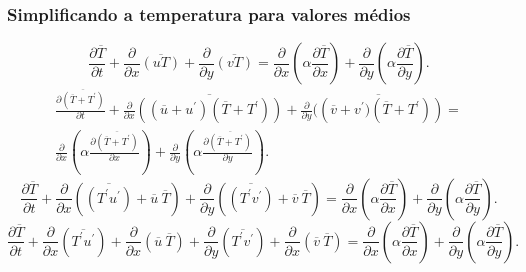 \documentclass[xcolor=dvipsnames,10pt,aspectratio=169]{beamer}
\begin{document}
		
		\begin{frame}
		\frametitle{Simplificando a temperatura para valores médios}
		\begin{equation}
		\frac{\partial \overline{T}}{\partial t} + {\frac{\partial{}}{\partial{x}} \overline{(u T)}} + 
		{\frac{\partial{}}{\partial{y}} \overline{(v T)}} 
		=
		{\frac{\partial{}}{\partial{x}}} \left(\alpha {\frac{\partial{\overline{T}}}{\partial{x}}} \right) +
		{\frac{\partial{}}{\partial{y}}} \left(\alpha {\frac{\partial{\overline{T}}}{\partial{y}}} \right) .
		\end{equation}
		\begin{equation}
		\begin{split}
		\frac{\partial \overline{(\overline{T} + T^\prime)}}{\partial t} +{\frac{\partial{}}{\partial{x}} \overline{\left((\overline{u} + u^\prime)  (\overline{T} + T^\prime) \right)}} + 
		{\frac{\partial{}}{\partial{y}} \overline{(\left(\overline{v} + v^\prime)  (\overline{T} + T^\prime) \right)}} 
		= \\
		{\frac{\partial{}}{\partial{x}}} \left(\alpha {\frac{\partial{\overline{(\overline{T} + T^\prime)}}}{\partial{x}}} \right) +
		{\frac{\partial{}}{\partial{y}}} \left(\alpha {\frac{\partial{\overline{(\overline{T} + T^\prime)}}}{\partial{y}}} \right) .
		\end{split}
		\end{equation}
		\begin{equation}
		\frac{\partial \overline{T}}{\partial t} +\frac{\partial{}}{\partial{x}} \left(\overline{\left({T^\prime u^\prime}\right)} + \overline{u} \ \overline{T}\right)     + 
		\frac{\partial{}}{\partial{y}} \left(\overline{\left({T^\prime v^\prime}\right)} + \overline{v} \ \overline{T}\right) 
		=
		{\frac{\partial{}}{\partial{x}}} \left(\alpha {\frac{\partial{\overline{T}}}{\partial{x}}} \right) +
		{\frac{\partial{}}{\partial{y}}} \left(\alpha {\frac{\partial{\overline{T}}}{\partial{y}}} \right) .
		\end{equation}
		\begin{equation}\label{equation_preparede}
		\frac{\partial \overline{T}}{\partial t} +\frac{\partial{}}{\partial{x}} \left(\overline{T^\prime  u^\prime}\right) + \frac{\partial{}}{\partial{x}}\left(\overline{u} \ \overline{T}\right)     + 
		\frac{\partial{}}{\partial{y}} \left(\overline{T^\prime v^\prime}\right) + \frac{\partial{}}{\partial{x}}\left(\overline{v} \ \overline{T}\right) 
		=
		{\frac{\partial{}}{\partial{x}}} \left(\alpha {\frac{\partial{\overline{T}}}{\partial{x}}} \right) +
		{\frac{\partial{}}{\partial{y}}} \left(\alpha {\frac{\partial{\overline{T}}}{\partial{y}}} \right) .
		\end{equation}
		\end{frame}
		
\end{document}
